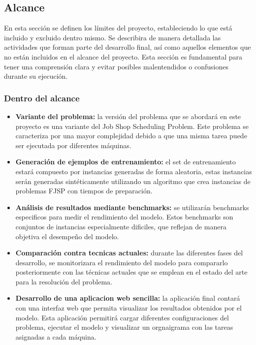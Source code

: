 \subsection{Alcance}
En esta sección se definen los límites del proyecto, estableciendo lo que está incluido 
y excluido dentro mismo. Se describira de manera detallada las actividades que forman 
parte del desarrollo final, así como aquellos elementos que no están incluidos en el 
alcance del proyecto. Esta sección es fundamental para tener una comprensión clara 
y evitar posibles malentendidos o confusiones durante su ejecución.

\subsubsection{Dentro del alcance}
\begin{itemize}
    \item \textbf{Variante del problema:} la versión del problema que se abordará en este proyecto
    es una variante del Job Shop Scheduling Problem. Este problema se caracteriza por una mayor
    complejidad debido a que una misma tarea puede ser ejecutada por diferentes máquinas.
    \item \textbf{Generación de ejemplos de entrenamiento:} el set de entrenamiento estará compuesto
    por instancias generadas de forma aleatoria, estas instancias serán generadas sintéticamente 
    utilizando un algoritmo que crea instancias de problemas FJSP con tiempos de preparación. 
    \item \textbf{Análisis de resultados mediante benchmarks:} se utilizarán benchmarks
    especificos para medir el rendimiento del modelo. Estos benchmarks son conjuntos de instancias
    especialmente dificiles, que reflejan de manera objetiva el desempeño del modelo.
    \item \textbf{Comparación contra tecnicas actuales:} durante las diferentes fases del desarrollo,
    se monitorizara el rendimiento del modelo para compararlo posteriormente con las técnicas actuales 
    que se emplean en el estado del arte para la resolución del problema. 
    \item \textbf{Desarrollo de una aplicacion web sencilla:} la aplicación final contará con una interfaz 
    web que permita visualizar los resultados obtenidos por el modelo. Esta aplicación
    permitirá cargar diferentes configuraciones del problema, ejecutar el modelo y visualizar
    un orgnaigrama con las tareas asignadas a cada máquina.
\end{itemize}

